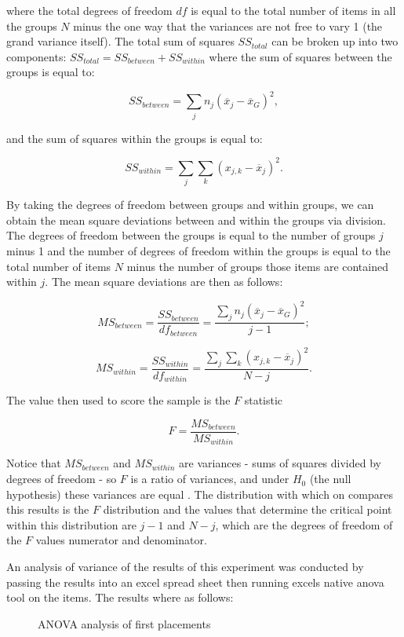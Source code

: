 where the total degrees of freedom $df$ is equal to the total number of items in
all the groups  $N$ minus the one way that the variances are not free to vary 1
(the grand variance itself). The total sum of squares $SS_{total}$ can be broken
up into two components: $SS_{total} = SS_{between} + SS_{within}$ where the sum
of squares between the groups is equal to:

$$SS_{between} = \sum_{j}n_{j}(\overline{x}_{j}-\overline{x}_{G})^{2},$$

and the sum of squares within the groups is equal to:

$$SS_{within} = \sum_{j}\sum_{k}(x_{j,k} - \overline{x}_{j})^{2}.$$

By taking the degrees of freedom between groups and within groups, we can obtain
the mean square deviations between and within the groups via division. The
degrees of freedom between the groups is equal to the number of groups $j$ minus 1
and the number of degrees of freedom within the groups is equal to the total
number of items $N$ minus the number of groups those items are contained within
$j$. The mean square deviations are then as follows:

$$MS_{between} = \frac{SS_{between}}{df_{between}} = \frac{\sum_{j}n_{j}(\overline{x}_{j}-\overline{x}_{G})^{2}}{j-1};$$

$$MS_{within} = \frac{SS_{within}}{df_{within}} = \frac{\sum_{j}\sum_{k}(x_{j,k}-\overline{x}_{j})^{2}}{N-j}.$$

The value then used to score the sample is the $F$ statistic

$$F = \frac{MS_{between}}{MS_{within}}.$$

Notice that $MS_{between}$ and $MS_{within}$ are variances - sums of squares
divided by degrees of freedom - so $F$ is a ratio of variances, and under $H_{0}$
(the null hypothesis) these variances are equal \cite{Cohen}. The distribution
with which on compares this results is the $F$ distribution and the values that
determine the critical point within this distribution are $j-1$ and $N-j$, which
are the degrees of freedom of the $F$ values numerator and denominator.

An analysis of variance of the results of this experiment was conducted by passing
the results into an excel spread sheet then running excels native anova tool on
the items. The results where as follows:

\begin{figure}[H]
\caption{ANOVA analysis of first placements}
\end{figure}

